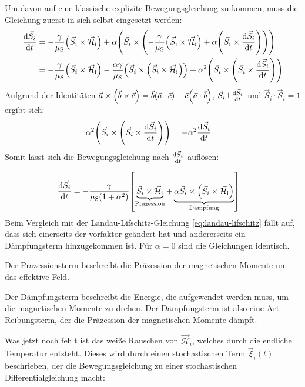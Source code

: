 \documentclass[main.tex]{subfiles}
\begin{document}
Um davon auf eine klassische explizite Bewegungsgleichung zu kommen, muss die Gleichung zuerst in sich selbst eingesetzt werden:
\begin{align}
	\dv{\vec{S}_i}{t} & = -\frac{\gamma }{\mu_{\text{S}}}\qty(\vec{S}_i
	\times
	\vec{\mathcal{H}}_{\text{i}}) + \alpha \qty(\vec{S}_i \times
	\qty(-\frac{\gamma }{\mu_{\text{S}}}\qty(\vec{S}_i
		\times
		\vec{\mathcal{H}}_{\text{i}}) + \alpha \qty(\vec{S}_i \times
	\dv{\vec{S}_i}{t})))                                                \\
	                  & = -\frac{\gamma }{\mu_{\text{S}}}\qty(\vec{S}_i
	\times
	\vec{\mathcal{H}}_{\text{i}}) - \frac{\alpha\gamma}{\mu_\text{S}}
	\qty(\vec{S}_i \times \qty(\vec{S}_i \times
		\vec{\mathcal{H}}_{\text{i}})) +
	\alpha^2 \qty(\vec{S}_i \times \qty(\vec{S}_i \times
		\dv{\vec{S}_i}{t}))
\end{align}
Aufgrund der Identitäten \(\vec{a} \times \qty(\vec{b} \times \vec{c}) = \vec{b} \qty(\vec{a} \cdot \vec{c}) - \vec{c} \qty(\vec{a} \cdot \vec{b})\), \(\vec{S}_i \bot \dv{\vec{S}_i}{t}\) und \(\vec{S}_i \cdot \vec{S}_i = 1\) ergibt sich:
\begin{align}
	\alpha^2 \qty(\vec{S}_i \times \qty(\vec{S}_i \times
	\dv{\vec{S}_i}{t})) & = -\alpha^2\dv{\vec{S}_i}{t}
\end{align}
Somit lässt sich die Bewegungsgleichung nach \(\dv{\vec{S}_i}{t}\) auflösen:

\begin{align}
	\dv{\vec{S}_i}{t} & = -\frac{\gamma
	}{\mu_{\text{S}}(1+\alpha^2)}\qty[\underbrace{\vec{S}_i \times \vec{\mathcal{H}}_{\text{i}}}_\text{Präzession} + \underbrace{\alpha \vec{S}_i \times
		\qty(\vec{S}_i \times
			\vec{\mathcal{H}}_{\text{i}})}_\text{Dämpfung}]\label{eq:llg}
\end{align}
Beim Vergleich mit der Landau-Lifschitz-Gleichung \eqref{eq:landau-lifschitz} fällt auf, dass sich einerseits der vorfaktor geändert hat und andererseits ein Dämpfungsterm hinzugekommen ist. Für \(\alpha = 0\) sind die Gleichungen identisch. 

Der Präzessionsterm beschreibt die Präzession der magnetischen Momente um das effektive Feld.

Der Dämpfungsterm beschreibt die Energie, die aufgewendet werden muss, um die magnetischen Momente zu drehen. Der Dämpfungsterm ist also eine Art Reibungsterm, der die Präzession der magnetischen Momente dämpft.

Was jetzt noch fehlt ist das weiße Rauschen von \( \vec{\mathcal{H}}_i \), welches durch die endliche Temperatur entsteht. Dieses wird durch einen stochastischen Term \(\vec{\xi}_i(t)\) beschrieben, der die Bewegungsgleichung zu einer stochastischen Differentialgleichung macht:
\end{document}
